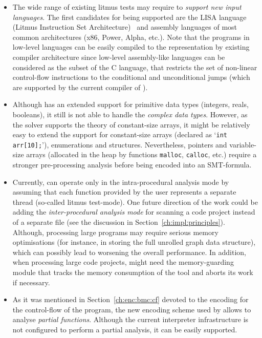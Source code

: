 \begin{itemize}[leftmargin=\parindent]
\item The wide range of existing litmus tests may require \porthos[2] to \textit{support new input languages}.
The first candidates for being supported are the LISA language (Litmus Instruction Set Architecture)~\cite{alglave2016syntax} and assembly languages of most common architectures (x86, Power, Alpha, etc.).
Note that the programs in low-level languages can be easily compiled to the \xgraph{} representation by existing compiler architecture since low-level assembly-like languages can be considered as the subset of the C language, that restricts the set of non-linear control-flow instructions to the conditional and unconditional jumps (which are supported by the current \xgraph{} compiler of \porthos[2]).

\item Although \porthos[2] has an extended support for primitive data types (integers, reals, booleans), it still is not able to handle the \textit{complex data types}.
However, as the  solver supports the theory of constant-size arrays, it might be relatively easy to extend the support for constant-size arrays (declared as `\lstinline{int arr[10];}'), enumerations and structures.
Nevertheless, pointers and variable-size arrays (allocated in the heap by functions \lstinline{malloc}, \lstinline{calloc}, etc.) require a stronger pre-processing analysis before being encoded into an SMT-formula.

\item Currently, \porthos[2] can operate only in the intra-procedural analysis mode by assuming that each function provided by the user represents a separate thread (so-called litmus test-mode).
One future direction of the work could be adding the \textit{inter-procedural analysis mode} for scanning a code project instead of a separate file (see the discussion in Section~\ref{ch:impl:principles}).
Although, processing large programs may require serious memory optimisations (for instance, in storing the full unrolled graph data structure), which can possibly lead to worsening the overall performance.
In addition, when processing large code projects, \porthos[2] might need the memory-guarding module that tracks the memory consumption of the tool and aborts its work if necessary.

\item As it was mentioned in Section~\ref{ch:enc:bmc:cf} devoted to the encoding for the control-flow of the program, the new encoding scheme used by \porthos[2] allows to analyse \textit{partial functions}.
Although the current \porthos[2] interpreter infrastructure is not configured to perform a partial analysis, it can be easily supported.


\end{itemize}
